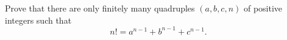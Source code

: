 Prove that there are only finitely many quadruples $(a, b, c, n)$ of positive integers such that
\[
n! = a^{n-1} + b^{n-1} + c^{n-1}.
\]
